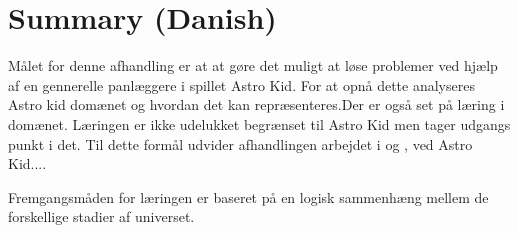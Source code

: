 \chapter{Summary (Danish)}
\begin{otherlanguage}{danish}
Målet for denne afhandling er at at gøre det muligt at løse problemer ved hjælp af en gennerelle panlæggere i spillet Astro Kid. For at opnå dette analyseres Astro kid domænet og hvordan det kan repræsenteres.Der er også set på læring i domænet. Læringen er ikke udelukket begrænset til Astro Kid men tager udgangs punkt i det. Til dette formål udvider afhandlingen arbejdet i \cite{Action-Schemas} og \cite{jacobsen2015a}, ved  Astro Kid....

Fremgangsmåden for læringen er baseret på en logisk sammenhæng mellem de forskellige stadier af universet. 

\end{otherlanguage}